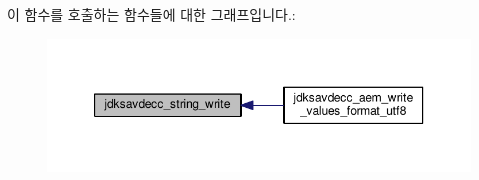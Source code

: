 이 함수를 호출하는 함수들에 대한 그래프입니다.\+:
\nopagebreak
\begin{figure}[H]
\begin{center}
\leavevmode
\includegraphics[width=350pt]{group__string_ga31818ea9bd31290c9476e84197e68cbe_icgraph}
\end{center}
\end{figure}


